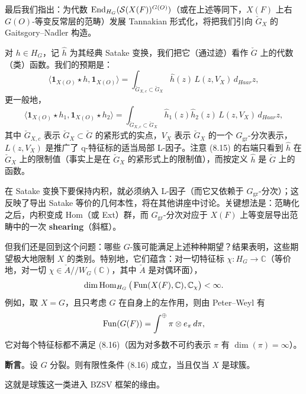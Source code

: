 最后我们指出：为代数 $\operatorname{End}_{H_G}(\mathcal S(X(F))^{G(O)})$（或在上述等同下，$X(F)$ 上右 $G(O)$-等变反常层的范畴）发展 Tannakian 形式化，将把我们引向 $\check G_X$ 的 Gaitsgory--Nadler 构造。

对 $h\in H_G$，记 $\hat h$ 为其经典 Satake 变换，我们把它（通过迹）看作 $\check G$ 上的代数（类）函数。我们的预期是：
\begin{equation}
  \langle\mathbf 1_{X(O)}\star h,\mathbf 1_{X(O)}\rangle
  =\int_{\check G_{X,c}\subset\check G_X}\hat h(z)\,L(z,V_X)\,d_{Haar}z,
  \label{eq:8-14}
\end{equation}
更一般地，
\begin{equation}
  \langle\mathbf 1_{X(O)}\star h_1,\mathbf 1_{X(O)}\star h_2\rangle
  =\int_{\check G_{X,c}\subset\check G_X}\hat h_1(z)\hat h_2(z)\,L(z,V_X)\,d_{Haar}z,
  \label{eq:8-15}
\end{equation}
其中 $\check G_{X,c}$ 表示 $\check G_X\subset\check G$ 的紧形式的实点，$V_X$ 表示 $\check G_X$ 的一个 $G_{\mathrm{gr}}$-分次表示，$L(z,V_X)$ 是推广了 q-特征标的适当局部 L-因子。注意 (8.15) 的右端只看到 $\hat h$ 在 $\check G_X$ 上的限制值（事实上是在 $\check G_X$ 的紧形式上的限制值），而按定义 $\hat h$ 是 $\check G$ 上的函数。

在 Satake 变换下要保持内积，就必须纳入 L-因子（而它又依赖于 $G_{\mathrm{gr}}$-分次）；这反映了导出 Satake 等价的几何本性，将在其他讲座中讨论。关键想法是：范畴化之后，内积变成 Hom（或 Ext）群，而 $G_{\mathrm{gr}}$-分次对应于 $X(F)$ 上等变层导出范畴中的一次 \textbf{shearing}（斜框）。

但我们还是回到这个问题：哪些 $G$-簇可能满足上述种种期望？结果表明，这些期望极大地限制 $X$ 的类别。特别地，它们蕴含：对一切特征标 $\chi:H_G\to\mathbb C$（等价地，对一切 $\chi\in\check A//W_G(\mathbb C)$，其中 $\check A$ 是对偶环面），
\begin{equation}
  \dim\operatorname{Hom}_{H_G}\big(\operatorname{Fun}(X(F),\mathbb C),\mathbb C_\chi\big)<\infty.
  \label{eq:8-16}
\end{equation}
例如，取 $X=G$，且只考虑 $G$ 在自身上的左作用，则由 Peter--Weyl 有
\begin{equation}
  \operatorname{Fun}(G(F))=\int^{\oplus}\pi\otimes e_\pi\,d\pi,
  \label{eq:8-17}
\end{equation}
它对每个特征标都不满足 (8.16)（因为对多数不可约表示 $\pi$ 有 $\dim(\pi)=\infty$）。

\textbf{断言}。设 $G$ 分裂。则有限性条件 (8.16) 成立，当且仅当 $X$ 是球簇。

这就是球簇这一类进入 BZSV 框架的缘由。

